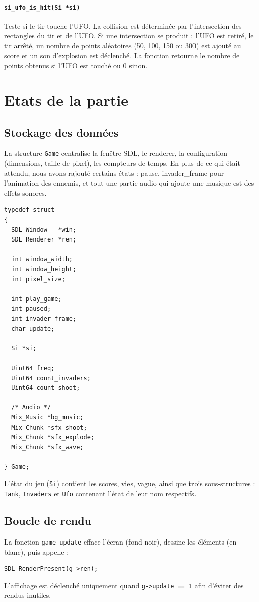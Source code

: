 \documentclass[12pt,a4paper]{report}
\begin{document}
\paragraph{\texttt{si\_ufo\_is\_hit(Si *si)}}  
Teste si le tir touche l'UFO. La collision est déterminée par l'intersection des rectangles du tir et de l'UFO.  
Si une intersection se produit : l'UFO est retiré, le tir arrêté, un nombre de points aléatoires (50, 100, 150 ou 300) est ajouté au score et un son d'explosion est déclenché. La fonction retourne le nombre de points obtenus si l'UFO est touché ou 0 sinon.




\section{Etats de la partie}

\subsection{Stockage des données}
    La structure \texttt{Game} centralise la fenêtre SDL, le renderer, la configuration (dimensions, taille de pixel), les compteurs de temps. 
    En plus de ce qui était attendu, nous avons rajouté certains états : pause, invader\_frame pour l'animation des ennemis, et tout une partie audio qui ajoute une musique est des effets sonores.
\begin{lstlisting}
typedef struct
{
  SDL_Window   *win;
  SDL_Renderer *ren;

  int window_width;
  int window_height;
  int pixel_size;

  int play_game;
  int paused;
  int invader_frame;
  char update;

  Si *si;

  Uint64 freq;
  Uint64 count_invaders;
  Uint64 count_shoot;

  /* Audio */
  Mix_Music *bg_music;
  Mix_Chunk *sfx_shoot;
  Mix_Chunk *sfx_explode;
  Mix_Chunk *sfx_wave;

} Game;
\end{lstlisting}

L'état du jeu (\texttt{Si}) contient les scores, vies, vague, ainsi que trois sous-structures :
\texttt{Tank}, \texttt{Invaders} et \texttt{Ufo} contenant l'état de leur nom respectifs.

\subsection{Boucle de rendu}
La fonction \texttt{game\_update} efface l'écran (fond noir), dessine les éléments (en blanc), puis appelle :
\begin{lstlisting}
SDL_RenderPresent(g->ren);
\end{lstlisting}
L'affichage est déclenché uniquement quand \texttt{g->update == 1} afin d'éviter des rendus inutiles.
\end{document}
